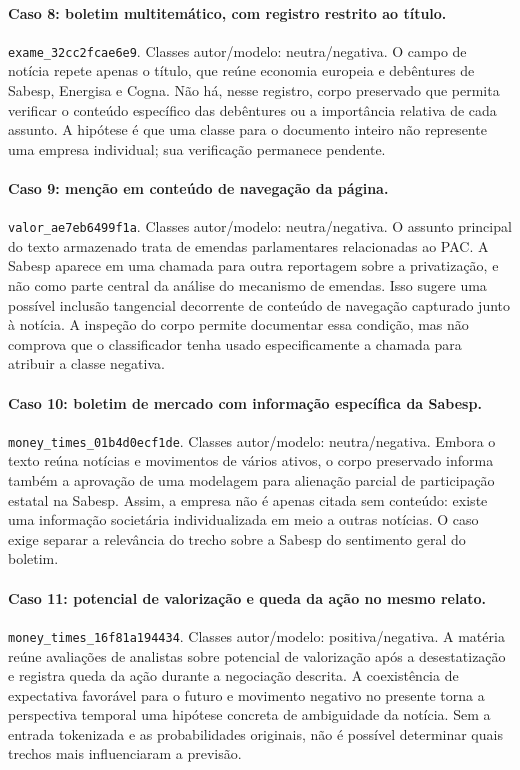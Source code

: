 \paragraph{Caso 8: boletim multitemático, com registro restrito ao título.}
\texttt{exame\_\allowbreak{}32cc2fcae6e9}. Classes autor/modelo: neutra/negativa. O campo de notícia repete apenas o título, que reúne economia europeia e debêntures de Sabesp, Energisa e Cogna. Não há, nesse registro, corpo preservado que permita verificar o conteúdo específico das debêntures ou a importância relativa de cada assunto. A hipótese é que uma classe para o documento inteiro não represente uma empresa individual; sua verificação permanece pendente.

\paragraph{Caso 9: menção em conteúdo de navegação da página.}
\texttt{valor\_\allowbreak{}ae7eb6499f1a}. Classes autor/modelo: neutra/negativa. O assunto principal do texto armazenado trata de emendas parlamentares relacionadas ao PAC. A Sabesp aparece em uma chamada para outra reportagem sobre a privatização, e não como parte central da análise do mecanismo de emendas. Isso sugere uma possível inclusão tangencial decorrente de conteúdo de navegação capturado junto à notícia. A inspeção do corpo permite documentar essa condição, mas não comprova que o classificador tenha usado especificamente a chamada para atribuir a classe negativa.

\paragraph{Caso 10: boletim de mercado com informação específica da Sabesp.}
\texttt{money\_\allowbreak{}times\_\allowbreak{}01b4d0ecf1de}. Classes autor/modelo: neutra/negativa. Embora o texto reúna notícias e movimentos de vários ativos, o corpo preservado informa também a aprovação de uma modelagem para alienação parcial de participação estatal na Sabesp. Assim, a empresa não é apenas citada sem conteúdo: existe uma informação societária individualizada em meio a outras notícias. O caso exige separar a relevância do trecho sobre a Sabesp do sentimento geral do boletim.

\paragraph{Caso 11: potencial de valorização e queda da ação no mesmo relato.}
\texttt{money\_\allowbreak{}times\_\allowbreak{}16f81a194434}. Classes autor/modelo: positiva/negativa. A matéria reúne avaliações de analistas sobre potencial de valorização após a desestatização e registra queda da ação durante a negociação descrita. A coexistência de expectativa favorável para o futuro e movimento negativo no presente torna a perspectiva temporal uma hipótese concreta de ambiguidade da notícia. Sem a entrada tokenizada e as probabilidades originais, não é possível determinar quais trechos mais influenciaram a previsão.

